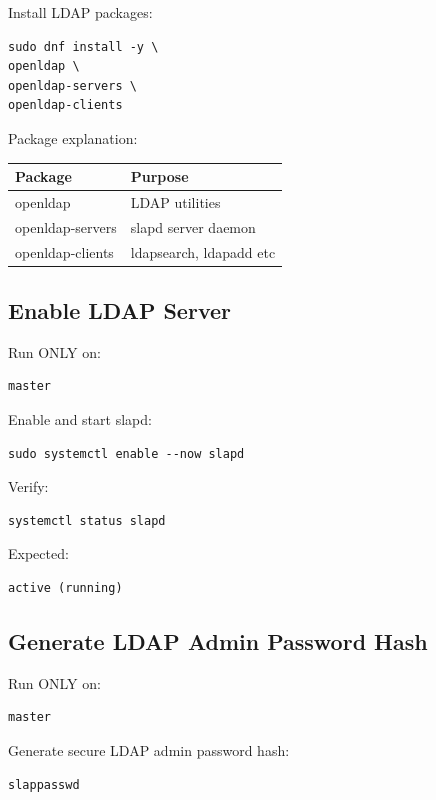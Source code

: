 \documentclass[11pt]{article}
\begin{document}
Install LDAP packages:

\begin{verbatim}
sudo dnf install -y \
openldap \
openldap-servers \
openldap-clients
\end{verbatim}

Package explanation:

\begin{center}
\begin{tabular}{ll}
Package & Purpose\\
\hline
openldap & LDAP utilities\\
openldap-servers & slapd server daemon\\
openldap-clients & ldapsearch, ldapadd etc\\
\end{tabular}
\end{center}
\subsection{Enable LDAP Server}
\label{sec:org50c75c1}

Run ONLY on:

\begin{verbatim}
master
\end{verbatim}

Enable and start slapd:

\begin{verbatim}
sudo systemctl enable --now slapd
\end{verbatim}

Verify:

\begin{verbatim}
systemctl status slapd
\end{verbatim}

Expected:

\begin{verbatim}
active (running)
\end{verbatim}
\subsection{Generate LDAP Admin Password Hash}
\label{sec:orge9c2a41}

Run ONLY on:

\begin{verbatim}
master
\end{verbatim}

Generate secure LDAP admin password hash:

\begin{verbatim}
slappasswd
\end{verbatim}
\end{document}
